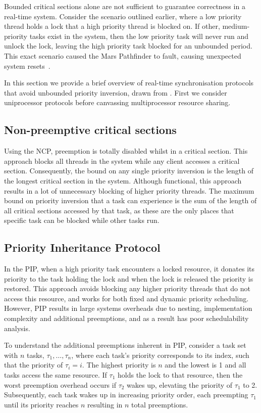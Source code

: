 Bounded critical sections alone are not sufficient to guarantee correctness in a real-time
system. Consider the scenario outlined earlier, where a low priority thread holds a lock that a high
priority thread is blocked on.  If other, medium-priority tasks exist in the system, then the low
priority task will never run and unlock the lock, leaving the high priority task blocked for an
unbounded period.  This exact scenario caused the Mars Pathfinder to fault, causing unexpected
system resets~\citep{Mars_Pathfinder}.

In this section we provide a brief overview of real-time synchronisation protocols that
avoid unbounded priority inversion, drawn from \citet{Sha_RL_90}. First we consider uniprocessor
protocols before canvassing multiprocessor resource sharing.

\subsection{Non-preemptive critical sections}

Using the \gls{NCP}, preemption is totally disabled whilst in a critical section.  This approach blocks
all threads in the system while any client accesses a critical section.  Consequently, the bound on
any single priority inversion is the length of the longest critical section in the system.  Although
functional, this approach results in a lot of unnecessary blocking of higher priority threads.  The
maximum bound on priority inversion that a task can experience is the sum of the length of all
critical sections accessed by that task, as these are the only places that specific task can be
blocked while other tasks run. 

\subsection{Priority Inheritance Protocol}
\label{sec:pip}

In the \gls{PIP}, when a high priority task encounters a locked resource, it donates its priority 
to the task holding the lock and when the lock is released the priority is restored. 
This approach avoids blocking any higher priority threads that do not access this resource, and
works for both fixed and dynamic priority scheduling.
However, \gls{PIP} results in large systems overheads due to nesting, implementation complexity and
additional preemptions, and as a result has poor schedulability analysis.

To understand the additional preemptions inherent in \gls{PIP}, consider a task set with $n$ tasks,
$\tau_{1}, \ldots, \tau_{n}$, where each task's priority
corresponds to its index, such that the priority of $\tau_{i} = i$. The highest priority is $n$ and the
lowest is 1 and all tasks access the same resource. If $\tau_{1}$ holds the lock to that resource, then
the worst preemption overhead occurs if $\tau_{2}$ wakes up, elevating the priority of $\tau_{1}$ to 2. Subsequently,
each task wakes up in increasing priority order, each preempting $\tau_{1}$ until its priority reaches
$n$ resulting in $n$ total preemptions. 

